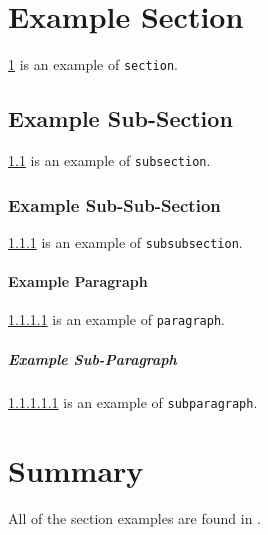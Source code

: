 \section{Example Section}
\label{sec:example-section}

\ref{sec:example-section} is an example of \texttt{section}.

\subsection{Example Sub-Section}
\label{sec:example-subsection}

\ref{sec:example-subsection} is an example of \texttt{subsection}.

\subsubsection{Example Sub-Sub-Section}
\label{sec:example-subsubsection}

\ref{sec:example-subsubsection} is an example of \texttt{subsubsection}.

\paragraph{Example Paragraph}
\label{sec:example-paragraph}

\ref{sec:example-paragraph} is an example of \texttt{paragraph}.

\subparagraph{Example Sub-Paragraph}
\label{sec:example-subparagraph}

\ref{sec:example-subparagraph} is an example of \texttt{subparagraph}.

\section{Summary}

All of the section examples are found in .
